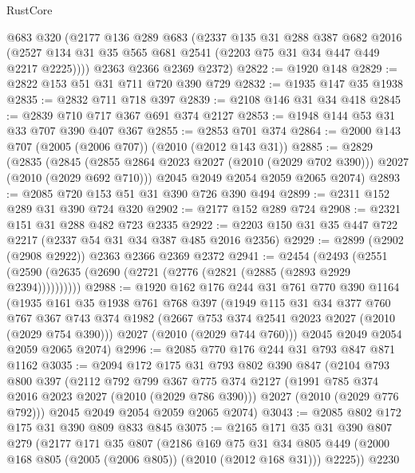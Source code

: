 \begin{lexlean}{RustCore}
\begin{coremodule}
      @683
      @320
      (@2177
        @136
        @289
        @683
        (@2337
          @135
          @31
          @288
          @387
          @682
          @2016
          (@2527 @134 @31 @35 @565 @681 @2541 (@2203 @75 @31 @34 @447 @449 @2217 @2225))))
      @2363
      @2366
      @2369
      @2372)
@2822 := @1920 @148
@2829 := @2822 @153 @51 @31 @711 @720 @390 @729
@2832 := @1935 @147 @35 @1938
@2835 := @2832 @711 @718 @397
@2839 := @2108 @146 @31 @34 @418
@2845 := @2839 @710 @717 @367 @691 @374 @2127
@2853 := @1948 @144 @53 @31 @33 @707 @390 @407 @367
@2855 := @2853 @701 @374
@2864 := @2000 @143 @707 (@2005 (@2006 @707)) (@2010 (@2012 @143 @31))
@2885 := @2829
    (@2835
      (@2845 (@2855 @2864 @2023 @2027 (@2010 (@2029 @702 @390))) @2027 (@2010 (@2029 @692 @710)))
      @2045
      @2049
      @2054
      @2059
      @2065
      @2074)
@2893 := @2085 @720 @153 @51 @31 @390 @726 @390 @494
@2899 := @2311 @152 @289 @31 @390 @724 @320
@2902 := @2177 @152 @289 @724
@2908 := @2321 @151 @31 @288 @482 @723 @2335
@2922 := @2203 @150 @31 @35 @447 @722 @2217 (@2337 @54 @31 @34 @387 @485 @2016 @2356)
@2929 := @2899 (@2902 (@2908 @2922)) @2363 @2366 @2369 @2372
@2941 := @2454
    (@2493 (@2551 (@2590 (@2635 (@2690 (@2721 (@2776 (@2821 (@2885 (@2893 @2929 @2394))))))))))
@2988 := @1920
    @162
    @176
    @244
    @31
    @761
    @770
    @390
    @1164
    (@1935
      @161
      @35
      @1938
      @761
      @768
      @397
      (@1949
        @115
        @31
        @34
        @377
        @760
        @767
        @367
        @743
        @374
        @1982
        (@2667 @753 @374 @2541 @2023 @2027 (@2010 (@2029 @754 @390)))
        @2027
        (@2010 (@2029 @744 @760)))
      @2045
      @2049
      @2054
      @2059
      @2065
      @2074)
@2996 := @2085 @770 @176 @244 @31 @793 @847 @871 @1162
@3035 := @2094
    @172
    @175
    @31
    @793
    @802
    @390
    @847
    (@2104
      @793
      @800
      @397
      (@2112
        @792
        @799
        @367
        @775
        @374
        @2127
        (@1991 @785 @374 @2016 @2023 @2027 (@2010 (@2029 @786 @390)))
        @2027
        (@2010 (@2029 @776 @792)))
      @2045
      @2049
      @2054
      @2059
      @2065
      @2074)
@3043 := @2085 @802 @172 @175 @31 @390 @809 @833 @845
@3075 := @2165
    @171
    @35
    @31
    @390
    @807
    @279
    (@2177
      @171
      @35
      @807
      (@2186
        @169
        @75
        @31
        @34
        @805
        @449
        (@2000 @168 @805 (@2005 (@2006 @805)) (@2010 (@2012 @168 @31)))
        @2225))
    @2230

\end{coremodule}
\end{lexlean}

